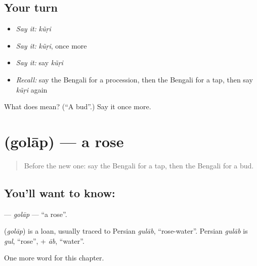 \subsection*{Your turn}
\begin{itemize}
\raggedright
  \item \emph{Say it:} \emph{kũṛi}
  \item \emph{Say it:} \emph{kũṛi}, once more
  \item \emph{Say it:} say \emph{kũṛi}
  \item \emph{Recall:} say the Bengali for a procession, then the Bengali for a tap, then say \emph{kũṛi} again
\end{itemize}

\begin{tcolorbox}[breakable,colback=teal!4,colframe=teal!35!black,title={Before you move on}]
What does  mean? (\textquotedblleft{}A bud\textquotedblright{}.) Say it once more.
\end{tcolorbox}
\section[\texorpdfstring{\bn{গোলাপ} (golāp)}{গোলাপ (golāp)}]{ (golāp) — a rose}

\label{lesson:BN-C171-golap}



\begin{quote}
Before the new one: say the Bengali for a tap, then the Bengali for a bud.
\end{quote}

\subsection*{You'll want to know: }
\textbf{} — \emph{golāp} — \textquotedblleft{}a rose\textquotedblright{}.

\begin{cousinweb}
\textbf{} (\emph{golāp}) is a loan, usually traced to Persian \emph{gulāb}, \textquotedblleft{}rose-water\textquotedblright{}. Persian \emph{gulāb} is \emph{gul}, \textquotedblleft{}rose\textquotedblright{}, + \emph{āb}, \textquotedblleft{}water\textquotedblright{}.
\end{cousinweb}

\begin{grammarlens}[title={What you've built}]
One more word for this chapter.
\end{grammarlens}

